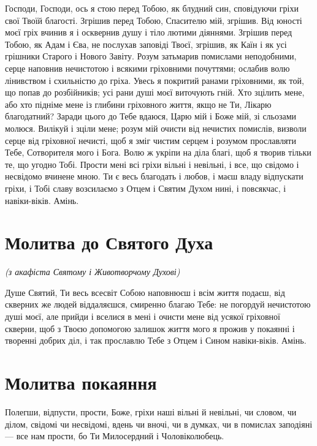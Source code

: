 \documentclass[chapters.tex]{subfiles}
\begin{document}
Господи, Господи, ось я стою перед Тобою, як блудний син, сповідуючи гріхи свої Твоїй благості. Згрішив перед Тобою, Спасителю мій, згрішив. Від юності моєї гріх вчинив я і осквернив душу і тіло лютими діяннями. Згрішив перед Тобою, як Адам і Єва, не послухав заповіді Твоєї, згрішив, як Каїн і як усі грішники Старого і Нового Завіту. Розум затьмарив помислами неподобними, серце наповнив нечистотою і всякими гріховними почуттями; ослабив волю лінивством і схильністю до гріха. Увесь я покритий ранами гріховними, як той, що попав до розбійників; усі рани душі моєї виточують гній. Хто зцілить мене, або хто підніме мене із глибини гріховного життя, якщо не Ти, Лікарю благодатний? Заради цього до Тебе вдаюся, Царю мій і Боже мій, зі сльозами молюся. Вилікуй і зціли мене; розум мій очисти від нечистих помислів, визволи серце від гріховної нечисті, щоб я зміг чистим серцем і розумом прославляти Тебе, Сотворителя мого і Бога. Волю ж укріпи на діла благі, щоб я творив тільки те, що угодно Тобі. Прости мені всі гріхи вільні і невільні, і все, що свідомо і несвідомо вчинене мною. Ти є весь благодать і любов, і маєш владу відпускати гріхи, і Тобі славу возсилаємо з Отцем і Святим Духом нині, і повсякчас, і навіки-віків. Амінь.

\section{Молитва до Святого Духа}
\emph{(з акафіста Святому і Животворчому Духові)}

Душе Святий, Ти весь всесвіт Собою наповнюєш і всім життя подаєш, від скверних же людей віддаляєшся, смиренно благаю Тебе: не погордуй нечистотою душі моєї, але прийди і вселися в мені і очисти мене від усякої гріховної скверни, щоб з Твоєю допомогою залишок життя мого я прожив у покаянні і творенні добрих діл, і так прославлю Тебе з Отцем і Сином навіки-віків. Амінь.

\section{Молитва покаяння}
Полегши, відпусти, прости, Боже, гріхи наші вільні й невільні, чи словом, чи ділом, свідомі чи несвідомі, вдень чи вночі, чи в думках, чи в помислах заподіяні — все нам прости, бо Ти Милосердний і Чоловіколюбець.
\end{document}

